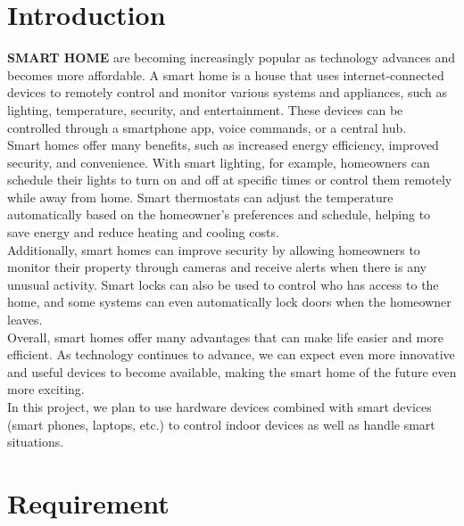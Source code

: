 \documentclass[a4paper, 13pt]{article}
\theoremstyle{definition}
\begin{document}
\newpage
\thispagestyle{empty}
\tableofcontents
\newpage


\section{Introduction}
\textbf{SMART HOME} are becoming increasingly popular as technology advances and becomes more affordable. A smart home is a house that uses internet-connected devices to remotely control and monitor various systems and appliances, such as lighting, temperature, security, and entertainment. These devices can be controlled through a smartphone app, voice commands, or a central hub.\\

Smart homes offer many benefits, such as increased energy efficiency, improved security, and convenience. With smart lighting, for example, homeowners can schedule their lights to turn on and off at specific times or control them remotely while away from home. Smart thermostats can adjust the temperature automatically based on the homeowner's preferences and schedule, helping to save energy and reduce heating and cooling costs.\\

Additionally, smart homes can improve security by allowing homeowners to monitor their property through cameras and receive alerts when there is any unusual activity. Smart locks can also be used to control who has access to the home, and some systems can even automatically lock doors when the homeowner leaves.\\

Overall, smart homes offer many advantages that can make life easier and more efficient. As technology continues to advance, we can expect even more innovative and useful devices to become available, making the smart home of the future even more exciting.\\

In this project, we plan to use hardware devices combined with smart devices (smart phones, laptops, etc.) to control indoor devices as well as handle smart situations.
\\

\newpage
\section{Requirement}
\end{document}
